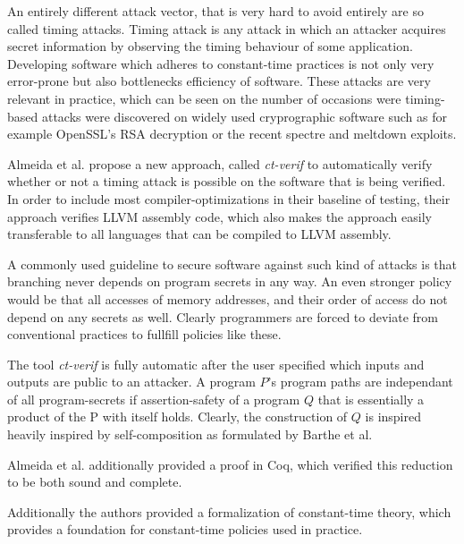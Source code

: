 \documentclass[a4paper,UKenglish]{lipics-v2018}
\begin{document}
An entirely different attack vector, that is very hard to avoid entirely are so called timing attacks. Timing attack is any attack in which an attacker acquires secret information by observing the timing behaviour of some application. Developing software which adheres to constant-time practices is not only very error-prone but also bottlenecks efficiency of software. These attacks are very relevant in practice, which can be seen on the number of occasions were timing-based attacks were discovered on widely used cryprographic software such as for example OpenSSL's RSA decryption\cite{verifying_constant_time_implementations} or the recent spectre and meltdown exploits. 


Almeida et al. propose a new approach, called \textit{ct-verif} to automatically verify whether  or not a timing attack is possible on the software that is being verified. In order to include most compiler-optimizations in their baseline of testing, their approach verifies LLVM assembly code, which also makes the approach easily transferable to all languages that can be compiled to LLVM assembly.\cite{verifying_constant_time_implementations}

A commonly used guideline to secure software against such kind of attacks is that branching never depends on program secrets in any way. An even stronger policy would be that all accesses of memory addresses, and their order of access do not depend on any secrets as well. Clearly programmers are forced to deviate from conventional practices to fullfill policies like these.\cite{verifying_constant_time_implementations}

The tool \textit{ct-verif} is fully automatic after the user specified which inputs and outputs are public to an attacker. A program $P$'s program paths are independant of all program-secrets if assertion-safety of a program $Q$ that is essentially a product of the P with itself holds.\cite{verifying_constant_time_implementations} Clearly, the construction of $Q$ is inspired heavily inspired by self-composition as formulated by Barthe et al.\cite{information_flow_by_self_composition} 

Almeida et al. additionally provided a proof in Coq, which verified this reduction to be both sound and complete.\cite{verifying_constant_time_implementations}

Additionally the authors provided a formalization of constant-time theory, which provides a foundation for constant-time policies used in practice.
\end{document}
